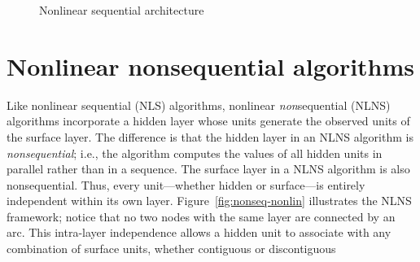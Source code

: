  \begin{figure}[t]
 \begin{mdframed}
 \begin{center}
 \end{center}
 \caption{Nonlinear sequential architecture}
 \label{fig:seq-nonlin}
 \end{mdframed}	
 \end{figure}

\section{Nonlinear nonsequential algorithms}
\label{subsec:nonseq-nonlin}
 Like nonlinear sequential (NLS) algorithms, nonlinear \textit{non}sequential
(NLNS) algorithms incorporate a hidden layer whose units generate the observed
 units of the surface layer.
The difference is that the hidden layer in an NLNS algorithm is \emph{nonsequential}; 
i.e., the algorithm computes the values of all hidden units in parallel rather than in a sequence.
The surface layer in a NLNS algorithm is also nonsequential.
 Thus, every unit---whether hidden or surface---is entirely independent
 within its own layer. Figure~\ref{fig:nonseq-nonlin} illustrates the NLNS framework; notice that no two nodes with the same layer are connected by an arc.
This intra-layer independence allows a hidden unit to associate with
any combination of surface units, whether contiguous or discontiguous

